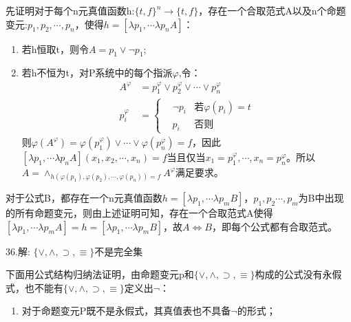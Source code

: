 \documentclass[a4paper]{ctexart}
\begin{document}
先证明对于每个n元真值函数h:$\{t,f\}^n\rightarrow\{t,f\}$，存在一个合取范式A以及n个命题变元:$p_1,p_2,\cdots,p_n$，使得$h=[\lambda p_1,\cdots\lambda p_nA]$：
\begin{enumerate}
  \item 若h恒取t，则令$A=p_1\vee\neg p_1$;
  \item 若h不恒为t，对P系统中的每个指派$\varphi$,令：
  \begin{align*}
    A^\varphi&=p_1^\varphi\vee p_2^\varphi\vee\cdots\vee p_n^\varphi \\
    p_i^\varphi&=\left\{
      \begin{aligned}
        &\neg p_i &\text{若}\varphi(p_i)=t \\
        &p_i &\text{否则}
      \end{aligned}
    \right.
  \end{align*}
  则$\varphi(A^\varphi)=\varphi(p_1^\varphi)\vee\cdots\vee\varphi(p_n^\varphi)=f$，因此$[\lambda p_1,\cdots\lambda p_nA](x_1,x_2,\cdots,x_n)=f$当且仅当$x_1=p_1^\varphi,\cdots,x_n=p_n^\varphi$。所以$A=\wedge_{h(\varphi(p_1),\varphi(p_2),\cdots,\varphi(p_n))=f}A^\varphi$满足要求。
\end{enumerate}
对于公式B，都存在一个n元真值函数$h=[\lambda p_1,\cdots\lambda p_mB]$，$p_1,p_2\cdots,p_m$为B中出现的所有命题变元，则由上述证明可知，存在一个合取范式A使得$[\lambda p_1,\cdots\lambda p_mA]=h=[\lambda p_1,\cdots\lambda p_mB]$，故$A\Leftrightarrow B$，即每个公式都有合取范式。\newline

\noindent 36.解:
$\{\vee,\wedge,\supset,\equiv\}$不是完全集

下面用公式结构归纳法证明，由命题变元p和$\{\vee,\wedge,\supset,\equiv\}$构成的公式没有永假式，也不能有$\{\vee,\wedge,\supset,\equiv\}$定义出$\neg$：
\begin{enumerate}
  \item 对于命题变元P既不是永假式，其真值表也不具备$\neg$的形式；
\end{enumerate}
\end{document}
